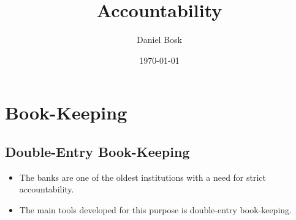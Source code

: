 \title{%
  Accountability
}
\author{Daniel Bosk}
\date{\today}


\begin{frame}
  \titlepage{}
\end{frame}

\begin{frame}
  \tableofcontents
\end{frame}





\section{Book-Keeping}

\subsection{Double-Entry Book-Keeping}

\begin{frame}
  \begin{itemize}
    \item The banks are one of the oldest institutions with a need for strict 
      accountability.

    \item The main tools developed for this purpose is double-entry 
      book-keeping.
  \end{itemize}
\end{frame}

